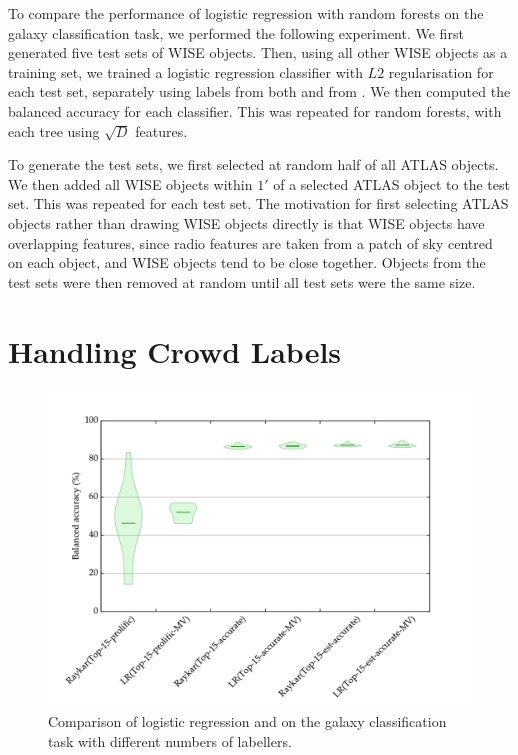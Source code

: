   To compare the performance of logistic regression with random forests on the
  galaxy classification task, we performed the following experiment. We first
  generated five test sets of WISE objects. Then, using all other WISE objects
  as a training set, we trained a logistic regression classifier with $L2$
  regularisation for each test set, separately using labels from both
  \citet{norris06} and from \citet{fan15}. We then computed the balanced
  accuracy for each classifier. This was repeated for random forests, with each
  tree using $\sqrt{D}$ features.

  To generate the test sets, we first selected at random half of all ATLAS
  objects. We then added all WISE objects within $1'$ of a selected ATLAS object
  to the test set. This was repeated for each test set. The motivation for first
  selecting ATLAS objects rather than drawing WISE objects directly is that WISE
  objects have overlapping features, since radio features are taken from a patch
  of sky centred on each object, and WISE objects tend to be close together.
  Objects from the test sets were then removed at random until all test sets
  were the same size.

\section{Handling Crowd Labels}
\label{sec:rgz-crowd-labels}

  \begin{figure}
    \centering
    \includegraphics[width=\textwidth]{images/experiments/rgz_raykar}
    \caption{Comparison of logistic regression and \citeauthor{raykar10} on the
      galaxy classification task with different numbers of labellers.}
    \label{fig:rgz-raykar}
  \end{figure}

